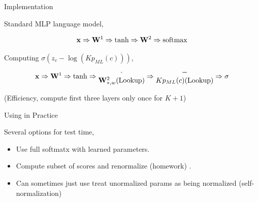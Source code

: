 \documentclass{beamer}
\begin{document}
\begin{frame}{Implementation}
  
  Standard MLP language model,

  \[\boldx \Rightarrow \boldW^1 \Rightarrow \tanh \Rightarrow  \boldW^2 \Rightarrow \softmax\]



  Computing $\sigma(z_c - \log(K p_{ML}(c)))$,
 \[\mathbf{x} \Rightarrow \mathbf{W}^1 \Rightarrow \tanh \Rightarrow
 \begin{matrix}
   \cdot \\ 
   \mathbf{W}^2_{*, w} \mathrm{(Lookup)}
 \end{matrix}
 \Rightarrow  \begin{matrix}
   - \\ 
   K p_{ML}(c) \mathrm{(Lookup)}
 \end{matrix}
\Rightarrow \sigma\]


 
                                                                                       

  (Efficiency, compute first three layers only once for $K+1$)
  \air 
  
\end{frame}

\begin{frame}{Using in Practice}
  
  Several options for test time,
  \begin{itemize}
  \item Use full softmatx with learned parameters.
    \air 
  \item Compute subset of scores and renormalize (homework)
.
\air 

\item Can sometimes just use treat unormalized params as being normalized (self-normalization)
  \end{itemize}


\end{frame}
\end{document}
